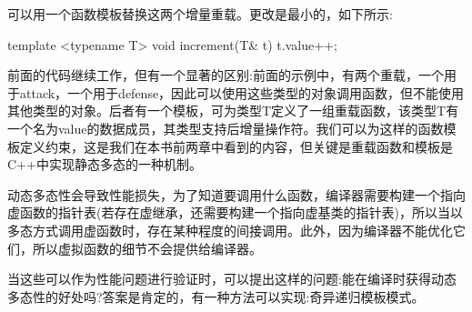 可以用一个函数模板替换这两个增量重载。更改是最小的，如下所示:

\begin{cpp}
template <typename T>
void increment(T& t) { t.value++; }
\end{cpp}

前面的代码继续工作，但有一个显著的区别:前面的示例中，有两个重载，一个用于attack，一个用于defense，因此可以使用这些类型的对象调用函数，但不能使用其他类型的对象。后者有一个模板，可为类型T定义了一组重载函数，该类型T有一个名为value的数据成员，其类型支持后增量操作符。我们可以为这样的函数模板定义约束，这是我们在本书前两章中看到的内容，但关键是重载函数和模板是C++中实现静态多态的一种机制。

动态多态性会导致性能损失，为了知道要调用什么函数，编译器需要构建一个指向虚函数的指针表(若存在虚继承，还需要构建一个指向虚基类的指针表)，所以当以多态方式调用虚函数时，存在某种程度的间接调用。此外，因为编译器不能优化它们，所以虚拟函数的细节不会提供给编译器。

当这些可以作为性能问题进行验证时，可以提出这样的问题:能在编译时获得动态多态性的好处吗?答案是肯定的，有一种方法可以实现:奇异递归模板模式。










































